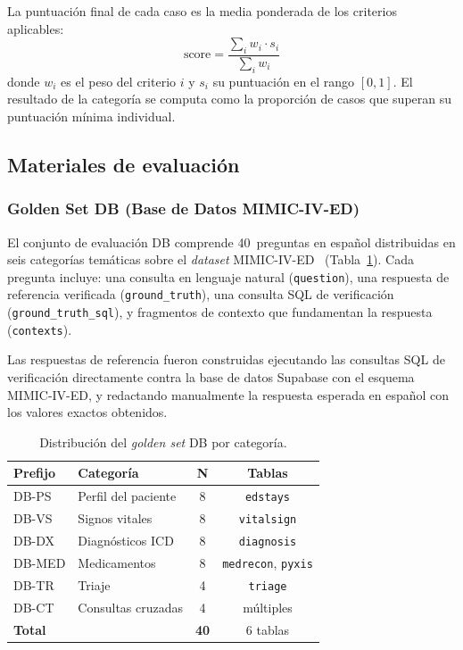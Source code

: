 La puntuación final de cada caso es la media ponderada de los criterios aplicables:
\begin{equation}
\text{score} = \frac{\sum_{i} w_i \cdot s_i}{\sum_{i} w_i}
\label{eq:score_tc}
\end{equation}
donde $w_i$ es el peso del criterio $i$ y $s_i$ su puntuación en el rango $[0, 1]$. El resultado de la categoría se computa como la proporción de casos que superan su puntuación mínima individual.


\subsection{Materiales de evaluación}
\label{subsec:materiales}

\subsubsection{Golden Set DB (Base de Datos \acs{MIMIC}-IV-\acs{ED})}

El conjunto de evaluación DB comprende 40~preguntas en español distribuidas en seis categorías temáticas sobre el \textit{dataset} \acs{MIMIC}-IV-\acs{ED}~\parencite{johnson2023mimiciv} (Tabla~\ref{tab:golden_set_db}). Cada pregunta incluye: una consulta en lenguaje natural (\texttt{question}), una respuesta de referencia verificada (\texttt{ground\_truth}), una consulta \ac{SQL} de verificación (\texttt{ground\_truth\_sql}), y fragmentos de contexto que fundamentan la respuesta (\texttt{contexts}).

Las respuestas de referencia fueron construidas ejecutando las consultas \ac{SQL} de verificación directamente contra la base de datos Supabase con el esquema \acs{MIMIC}-IV-\acs{ED}, y redactando manualmente la respuesta esperada en español con los valores exactos obtenidos.

\begin{table}[H]
\centering
\caption{Distribución del \textit{golden set} DB por categoría.}
\label{tab:golden_set_db}
\footnotesize
\begin{tabularx}{\columnwidth}{lXcc}
\toprule
\textbf{Prefijo} & \textbf{Categoría} & \textbf{N} & \textbf{Tablas} \\
\midrule
DB-PS  & Perfil del paciente    & 8 & \texttt{edstays} \\
DB-VS  & Signos vitales         & 8 & \texttt{vitalsign} \\
DB-DX  & Diagnósticos \ac{ICD}       & 8 & \texttt{diagnosis} \\
DB-MED & Medicamentos           & 8 & \texttt{medrecon}, \texttt{pyxis} \\
DB-TR  & Triaje                 & 4 & \texttt{triage} \\
DB-CT  & Consultas cruzadas     & 4 & múltiples \\
\midrule
\multicolumn{2}{l}{\textbf{Total}} & \textbf{40} & 6 tablas \\
\bottomrule
\end{tabularx}
\end{table}


